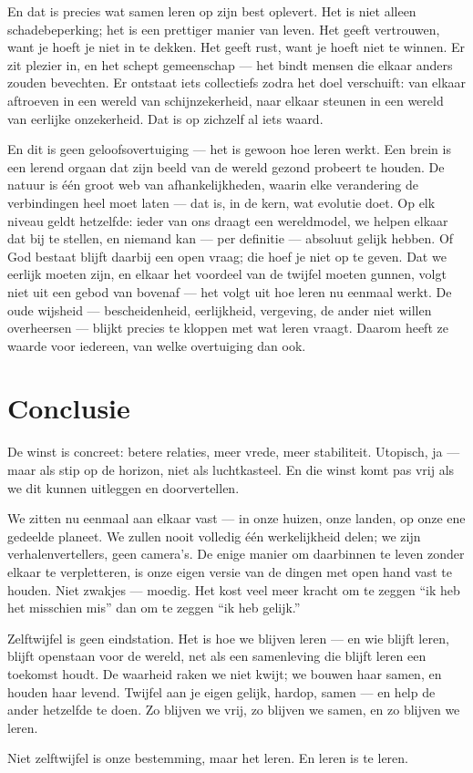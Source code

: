 \documentclass{article}
\begin{document}
En dat is precies wat samen leren op zijn best oplevert. Het is niet alleen schadebeperking; het is een prettiger manier van leven. Het geeft vertrouwen, want je hoeft je niet in te dekken. Het geeft rust, want je hoeft niet te winnen. Er zit plezier in, en het schept gemeenschap --- het bindt mensen die elkaar anders zouden bevechten. Er ontstaat iets collectiefs zodra het doel verschuift: van elkaar aftroeven in een wereld van schijnzekerheid, naar elkaar steunen in een wereld van eerlijke onzekerheid. Dat is op zichzelf al iets waard.

En dit is geen geloofsovertuiging --- het is gewoon hoe leren werkt. Een brein is een lerend orgaan dat zijn beeld van de wereld gezond probeert te houden. De natuur is één groot web van afhankelijkheden, waarin elke verandering de verbindingen heel moet laten --- dat is, in de kern, wat evolutie doet. Op elk niveau geldt hetzelfde: ieder van ons draagt een wereldmodel, we helpen elkaar dat bij te stellen, en niemand kan --- per definitie --- absoluut gelijk hebben. Of God bestaat blijft daarbij een open vraag; die hoef je niet op te geven. Dat we eerlijk moeten zijn, en elkaar het voordeel van de twijfel moeten gunnen, volgt niet uit een gebod van bovenaf --- het volgt uit hoe leren nu eenmaal werkt. De oude wijsheid --- bescheidenheid, eerlijkheid, vergeving, de ander niet willen overheersen --- blijkt precies te kloppen met wat leren vraagt. Daarom heeft ze waarde voor iedereen, van welke overtuiging dan ook.

\section*{Conclusie}

De winst is concreet: betere relaties, meer vrede, meer stabiliteit. Utopisch, ja --- maar als stip op de horizon, niet als luchtkasteel. En die winst komt pas vrij als we dit kunnen uitleggen en doorvertellen.

We zitten nu eenmaal aan elkaar vast --- in onze huizen, onze landen, op onze ene gedeelde planeet. We zullen nooit volledig één werkelijkheid delen; we zijn verhalenvertellers, geen camera's. De enige manier om daarbinnen te leven zonder elkaar te verpletteren, is onze eigen versie van de dingen met open hand vast te houden. Niet zwakjes --- moedig. Het kost veel meer kracht om te zeggen \enquote{ik heb het misschien mis} dan om te zeggen \enquote{ik heb gelijk.}

Zelftwijfel is geen eindstation. Het is hoe we blijven leren --- en wie blijft leren, blijft openstaan voor de wereld, net als een samenleving die blijft leren een toekomst houdt. De waarheid raken we niet kwijt; we bouwen haar samen, en houden haar levend. Twijfel aan je eigen gelijk, hardop, samen --- en help de ander hetzelfde te doen. Zo blijven we vrij, zo blijven we samen, en zo blijven we leren.

Niet zelftwijfel is onze bestemming, maar het leren. En leren is te leren.
\end{document}
